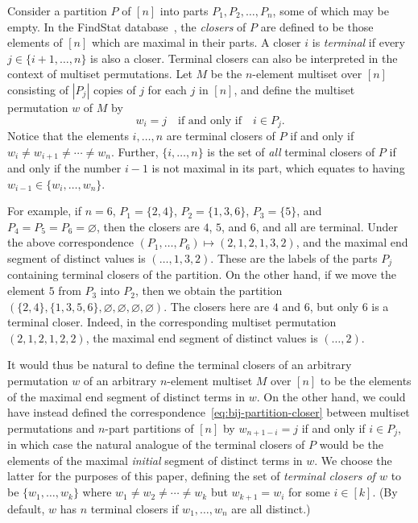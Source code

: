 \documentclass[letterpaper]{amsart}
\theoremstyle{plain}
\theoremstyle{definition}
\theoremstyle{remark}
\begin{document}
Consider a partition $P$ of $[n]$ into parts $P_1, P_2, \ldots, P_n$, some of which may be empty.
In the FindStat database~\cite[St001050]{FindStat}, the {\em closers} of $P$ are defined to be those elements of $[n]$ which are maximal in their parts.
A closer $i$ is {\em terminal} if every $j \in \{i+1, \ldots, n\}$ is also a closer.
Terminal closers can also be interpreted in the context of multiset permutations.
Let $M$ be the $n$-element multiset over $[n]$ consisting of $|P_j|$ copies of $j$ for each $j$ in $[n]$, and define the multiset permutation $w$ of $M$ by
\begin{equation}\label{eq:bij-partition-closer}
    w_i = j \quad \mbox{if and only if} \quad i \in P_j.
\end{equation}
Notice that the elements $i, \ldots, n$ are terminal closers of $P$ if and only if $w_i \neq w_{i+1} \neq \cdots \neq w_n$.
Further, $\{i, \ldots, n\}$ is the set of {\em all} terminal closers of $P$ if and only if the number $i-1$ is not maximal in its part, which equates to having $w_{i-1} \in \{w_i, \ldots, w_n\}$.


For example, if $n = 6$, $P_1 = \{2,4\}$, $P_2 = \{1,3,6\}$, $P_3 = \{5\}$, and $P_4 = P_5 = P_6 = \varnothing$, then the closers are $4$, $5$, and $6$, and all are terminal.
Under the above correspondence $(P_1, \ldots, P_6) \mapsto (2,1,2,1,3,2)$, and the maximal end segment of distinct values is $(\ldots,1,3,2)$.
These are the labels of the parts $P_j$ containing terminal closers of the partition.
On the other hand, if we move the element $5$ from $P_3$ into $P_2$, then we obtain the partition $(\{2,4\}, \{1,3,5,6\}, \varnothing, \varnothing, \varnothing, \varnothing)$.
The closers here are $4$ and $6$, but only $6$ is a terminal closer.
Indeed, in the corresponding multiset permutation $(2,1,2,1,2,2)$, the maximal end segment of distinct values is $(\ldots, 2)$.


It would thus be natural to define the terminal closers of an arbitrary permutation $w$ of an arbitrary $n$-element multiset $M$ over $[n]$ to be the elements of the maximal end segment of distinct terms in $w$.
On the other hand, we could have instead defined the correspondence~\eqref{eq:bij-partition-closer} between multiset permutations and $n$-part partitions of $[n]$ by $w_{n + 1 - i} = j$ if and only if $i \in P_j$, in which case the natural analogue of the terminal closers of $P$ would be the elements of the maximal {\em initial} segment of distinct terms in $w$.
We choose the latter for the purposes of this paper, defining the set of {\em terminal closers of $w$} to be $\{w_1, \ldots, w_k\}$ where $w_1 \neq w_2 \neq \cdots \neq w_k$ but $w_{k+1}=w_i$ for some $i \in [k]$. 
(By default, $w$ has $n$ terminal closers if $w_1, \ldots, w_n$ are all distinct.) 
\end{document}
